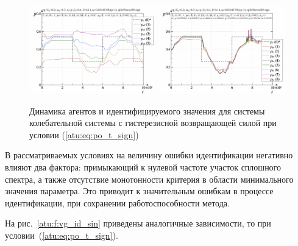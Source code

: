 \begin{figure}[ht!]
\begin{center}
  \includegraphics[width=0.49\textwidth]{p/cha/vg/vg_id-p_t_pi_ql3rlWvnAAW_sign.png}
  \hfill
  \includegraphics[width=0.49\textwidth]{p/cha/vg/vg_id-p_t_p_ql3rlWvnAAW_sign.png}
\end{center}
  \caption{Динамика агентов и идентифицируемого значения для системы колебательной системы с гистерезисной возвращающей силой при условии (\ref{atu:eq:po_t_sign})}
\label{atu:f:vg_id_sign}
\end{figure}

В рассматриваемых условиях на величину ошибки идентификации
негативно влияют два фактора: примыкающий к нулевой частоте
участок сплошного спектра, а также отсутствие монотонности критерия
в области минимального значения параметра.
Это приводит к значительным ошибкам в процессе идентификации,
при сохранении работоспособности метода.


На рис.~\ref{atu:f:vg_id_sin}
приведены аналогичные зависимости, то при условии~(\ref{atu:eq:po_t_sign}).

